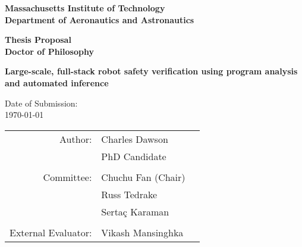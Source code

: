 
\begin{center}
	{\LARGE\bf Massachusetts Institute of Technology \\
	\vspace{0.25\baselineskip}
	Department of Aeronautics and Astronautics}
	\vspace{\baselineskip}

	{\Large\bf Thesis Proposal \\
	\vspace{0.25\baselineskip}
	Doctor of Philosophy}
	\vspace{4\baselineskip}

	\vspace{2\baselineskip}
	{\LARGE\bf Large-scale, full-stack robot safety verification using program analysis and automated inference}
	\vspace{3\baselineskip}

	Date of Submission: \\
	\vspace{0.5\baselineskip}
	\today

	\vspace{8\baselineskip}

	\begin{tabular}{rlc}
		{\small \sc Author:}
	        	                    & Charles Dawson  & \\
	        	                    & PhD Candidate & \\
		\\ %
		{\small \sc Committee:}
	        	                    & Chuchu Fan (Chair)  & \\
	            	                & Russ Tedrake & \\
	            	                & Serta\c c Karaman & \\
		\\ %
		{\small \sc External Evaluator:}
	            	                & Vikash Mansinghka & \\
	\end{tabular}
\end{center}

